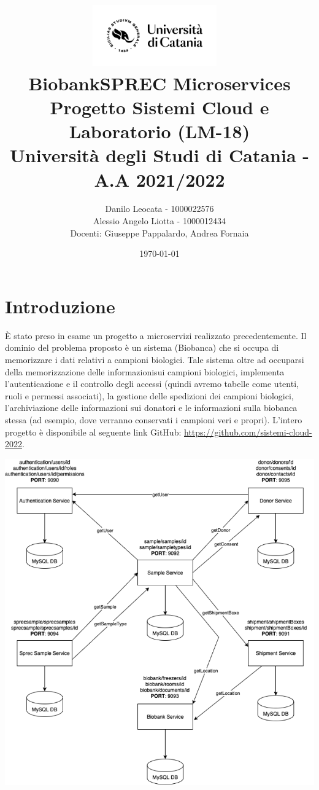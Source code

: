 \documentclass{article}
\title{ %
\includegraphics[width=0.4\textwidth]{UniCT-Logo-Nero}~\\
BiobankSPREC Microservices \\ 
\large Progetto Sistemi Cloud e Laboratorio (LM-18) \\ Università degli Studi di Catania - A.A 2021/2022 \\
}
\author{ Danilo Leocata - 1000022576 \\ Alessio Angelo Liotta - 1000012434 \\Docenti: Giuseppe Pappalardo, Andrea Fornaia}
\date{\today}
\begin{document}
\maketitle %

\pagebreak



\section{Introduzione}

È stato preso in esame un progetto a microservizi realizzato precedentemente. Il dominio del problema proposto è un sistema (Biobanca) che si occupa di
memorizzare i dati relativi a campioni biologici.
Tale sistema oltre ad occuparsi della memorizzazione delle informazionisui campioni
biologici, implementa l’autenticazione e il controllo degli accessi (quindi avremo
tabelle come utenti, ruoli e permessi associati), la gestione delle spedizioni dei
campioni biologici, l’archiviazione delle informazioni sui donatori e le
informazioni sulla biobanca stessa (ad esempio, dove verranno conservati i campioni
veri e propri). L'intero progetto è disponibile al seguente link GitHub: \href{https://github.com/sistemi-cloud-2022}{https://github.com/sistemi-cloud-2022}.

\begin{center}
    \includegraphics[width=0.6\linewidth]{architettura.png}
\end{center}
\end{document}
